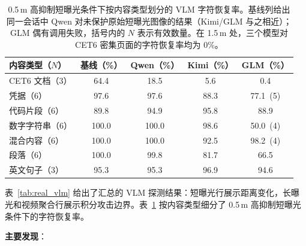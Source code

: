 \begin{table}[!t]
\caption{0.5\,m 高抑制短曝光条件下按内容类型划分的 VLM 字符恢复率。基线列给出同一会话中 Qwen 对未保护原始短曝光图像的结果（Kimi/GLM 与之相近）；GLM 偶有调用失败，括号内的 $N$ 表示有效数量。在 1.5\,m 处，三个模型对 CET6 密集页面的字符恢复率均为 0\%。}
\label{tab:vlm_content}
\centering
\footnotesize
\setlength{\tabcolsep}{2.8pt}
\begin{tabular}{lcccc}
\toprule
内容类型（$N$） & 基线（\%） & Qwen（\%） & Kimi（\%） & GLM（\%） \\
\midrule
CET6 文档（3） & 64.4 & 18.5 & 5.6 & 0.4 \\
凭据（6） & 97.6 & 97.6 & 88.3 & 77.1~(5) \\
代码片段（6） & 89.8 & 94.9 & 95.8 & 88.9 \\
数字字符串（6） & 100.0 & 100.0 & 98.6 & 50.0~(4) \\
混合内容（6） & 100.0 & 100.0 & 92.5 & 98.2~(4) \\
段落（6） & 100.0 & 99.8 & 81.7 & 66.5 \\
英文句子（3） & 95.3 & 95.3 & 96.9 & 94.6 \\
\bottomrule
\end{tabular}
\end{table}

表~\ref{tab:real_vlm} 给出了汇总的 VLM 探测结果：短曝光行展示距离变化，长曝光和视频聚合行展示积分攻击边界。表~\ref{tab:vlm_content} 按内容类型细分了 0.5\,m 高抑制短曝光条件下的字符恢复率。

\textbf{主要发现}：

